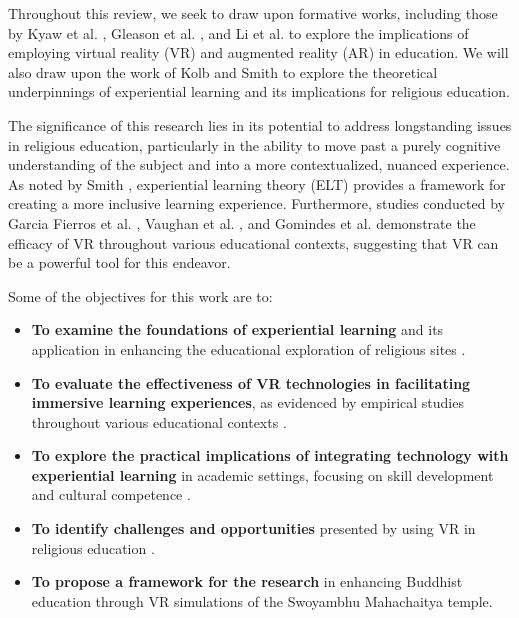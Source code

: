 \documentclass[conference]{IEEEtran}
\begin{document}
Throughout this review, we seek to draw upon formative works, including those by Kyaw et al. \cite{kyaw_comparing_2023}, Gleason et al. \cite{gleason_developing_2022}, and Li et al. \cite{li_religious_2023} to explore the implications of employing virtual reality (VR) and augmented reality (AR) in education. We will also draw upon the work of Kolb \cite{kolb_experiential_1984} and Smith \cite{smith_abstracting_2011} to explore the theoretical underpinnings of experiential learning and its implications for religious education.

The significance of this research lies in its potential to address longstanding issues in religious education, particularly in the ability to move past a purely cognitive understanding of the subject and into a more contextualized, nuanced experience. As noted by Smith \cite{smith_abstracting_2011}, experiential learning theory (ELT) provides a framework for creating a more inclusive learning experience. Furthermore, studies conducted by Garcia Fierros et al. \cite{garcia_fierros_virtualcpr_2021}, Vaughan et al. \cite{vaughan_cpr_2019}, and Gomindes et al. \cite{gomindes_use_2023} demonstrate the efficacy of VR throughout various educational contexts, suggesting that VR can be a powerful tool for this endeavor.

Some of the objectives for this work are to:

\begin{itemize}
    \item \textbf{To examine the foundations of experiential learning} and its application in enhancing the educational exploration of religious sites \cite{henderson_world_2000} \cite{kolb_experiential_1984}.
    \item \textbf{To evaluate the effectiveness of VR technologies in facilitating immersive learning experiences}, as evidenced by empirical studies throughout various educational contexts \cite{kyaw_comparing_2023}.
    \item \textbf{To explore the practical implications of integrating technology with experiential learning} in academic settings, focusing on skill development and cultural competence \cite{li_religious_2023}.
    \item \textbf{To identify challenges and opportunities} presented by using VR in religious education \cite{peng_virtual_2020} \cite{gleason_developing_2022}.
    \item \textbf{To propose a framework for the research} in enhancing Buddhist education through VR simulations of the Swoyambhu Mahachaitya temple.
\end{itemize}
\end{document}
